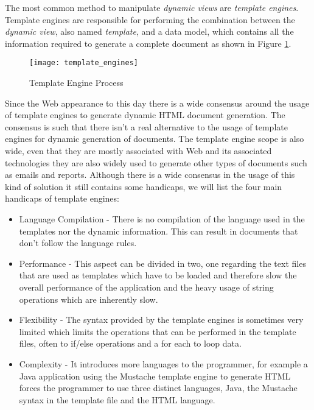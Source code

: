 \noindent
The most common method to manipulate \textit{dynamic views} are \textit{template engines}. Template engines are responsible for performing the combination between the \textit{dynamic view}, also named \textit{template}, and a data model, which contains all the information required to generate a complete document as shown in Figure \ref{img:templateengineprocess}.

\begin{figure}[H]
	\centering
	\texttt{[image: template\_engines]}
	\caption{Template Engine Process}
	\label{img:templateengineprocess}
\end{figure}

\noindent
Since the Web appearance to this day there is a wide consensus around the usage of template engines to generate dynamic \ac{HTML} document generation. The consensus is such that there isn't a real alternative to the usage of template engines for dynamic generation of documents.  The template engine scope is also wide, even that they are mostly associated with Web and its associated technologies they are also widely used to generate other types of documents such as emails and reports. Although there is a wide consensus in the usage of this kind of solution it still contains some handicaps, we will list the four main handicaps of template engines:

\begin{itemize}
	\item Language Compilation - There is no compilation of the language used in the templates nor the dynamic information. This can result in documents that don't follow the language rules.
	\item Performance - This aspect can be divided in two, one regarding the text files that are used as templates which have to be loaded and therefore slow the overall performance of the application and the heavy usage of string operations which are inherently slow.
\newpage
	\item Flexibility - The syntax provided by the template engines is sometimes very limited which limits the operations that can be performed in the template files, often to if/else operations and a for each to loop data.
	\item Complexity - It introduces more languages to the programmer, for example a Java application using the Mustache template engine to generate \ac{HTML} forces the programmer to use three distinct languages, Java, the Mustache syntax in the template file and the \ac{HTML} language.
\end{itemize}

